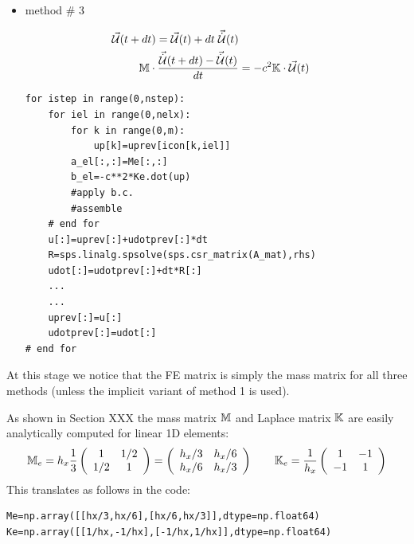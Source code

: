 \begin{itemize}
\item method \# 3

\begin{align}
\vec{\cal U}(t+dt) = \vec{\cal U}(t) + dt \; \vec{\dot{{\cal U}}}(t) \\
{\mathbb{M}} \cdot \frac{\vec{\dot{{\cal U}}}(t+dt)-\vec{\dot{{\cal U}}}(t) }{dt}  &= -c^2 {\mathbb{K}} \cdot \vec{\cal U}(t) 
\end{align}
\begin{lstlisting}
for istep in range(0,nstep):
    for iel in range(0,nelx):
        for k in range(0,m):
            up[k]=uprev[icon[k,iel]]
        a_el[:,:]=Me[:,:]
        b_el=-c**2*Ke.dot(up)
        #apply b.c.
        #assemble
    # end for
    u[:]=uprev[:]+udotprev[:]*dt
    R=sps.linalg.spsolve(sps.csr_matrix(A_mat),rhs)
    udot[:]=udotprev[:]+dt*R[:]
    ...
    ...
    uprev[:]=u[:]
    udotprev[:]=udot[:]
# end for
\end{lstlisting}





 
\end{itemize}
At this stage we notice that the FE matrix is simply the 
mass matrix for all three methods (unless the implicit
variant of method 1 is used). 



As shown in Section XXX the mass matrix ${\mathbb{M}}$ and Laplace matrix ${\mathbb{K}}$ are 
easily analytically computed for linear 1D elements:
\[
{\mathbb{M}}_e=
h_x\frac{1}{3}
\left(
\begin{array}{cc}
1 & 1/2 \\ 1/2 & 1
\end{array}
\right)
=
\left(
\begin{array}{cc}
h_x/3 & h_x/6 \\ h_x/6 & h_x/3
\end{array}
\right)
\qquad
{\mathbb{K}}_e=
\frac{1}{h_x}
\left(
\begin{array}{cc}
1 & -1 \\ -1 & 1
\end{array}
\right)
\]
This translates as follows in the code:
\begin{lstlisting}
Me=np.array([[hx/3,hx/6],[hx/6,hx/3]],dtype=np.float64)
Ke=np.array([[1/hx,-1/hx],[-1/hx,1/hx]],dtype=np.float64)
\end{lstlisting}


